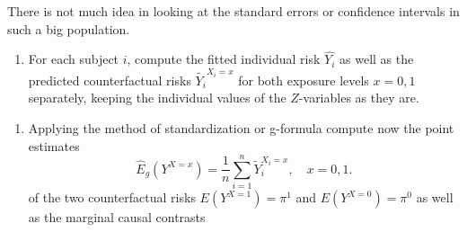 \documentclass[
]{book}
\newenvironment{Shaded}{\begin{snugshade}}{\end{snugshade}}
\newcommand{\AttributeTok}[1]{\textcolor[rgb]{0.13,0.29,0.53}{#1}}
\newcommand{\CommentTok}[1]{\textcolor[rgb]{0.56,0.35,0.01}{\textit{#1}}}
\newcommand{\DecValTok}[1]{\textcolor[rgb]{0.00,0.00,0.81}{#1}}
\newcommand{\FunctionTok}[1]{\textcolor[rgb]{0.13,0.29,0.53}{\textbf{#1}}}
\newcommand{\NormalTok}[1]{#1}
\newcommand{\OtherTok}[1]{\textcolor[rgb]{0.56,0.35,0.01}{#1}}
\newcommand{\SpecialCharTok}[1]{\textcolor[rgb]{0.81,0.36,0.00}{\textbf{#1}}}
\newcommand{\StringTok}[1]{\textcolor[rgb]{0.31,0.60,0.02}{#1}}
\providecommand{\tightlist}{%
  \setlength{\itemsep}{0pt}\setlength{\parskip}{0pt}}
\begin{document}
There is not much idea in looking at the
standard errors or confidence intervals in such a big population.

\begin{enumerate}
\def\labelenumi{\arabic{enumi}.}
\setcounter{enumi}{1}
\tightlist
\item
  For each subject \(i\), compute the fitted
  individual risk \(\widehat{Y_i}\) as well as
  the predicted counterfactual
  risks \(\widetilde{Y_i}^{X_i=x}\) for both exposure levels
  \(x=0,1\) separately,
  keeping the individual values of the \(Z\)-variables as they are.
\end{enumerate}

\begin{Shaded}
\end{Shaded}

\begin{enumerate}
\def\labelenumi{\arabic{enumi}.}
\setcounter{enumi}{2}
\tightlist
\item
  Applying the method of standardization or g-formula
  compute now the point estimates
  \[ \widehat{E}_g(Y^{X=x}) =
   \frac{1}{n} \sum_{i=1}^n \widetilde{Y}_i^{X_i=x}, \quad x=0,1. \]
  of the two counterfactual risks \(E(Y^{X=1}) = \pi^1\) and
  \(E(Y^{X=0})=\pi^0\)
  as well as the marginal causal contrasts
\end{enumerate}
\end{document}
